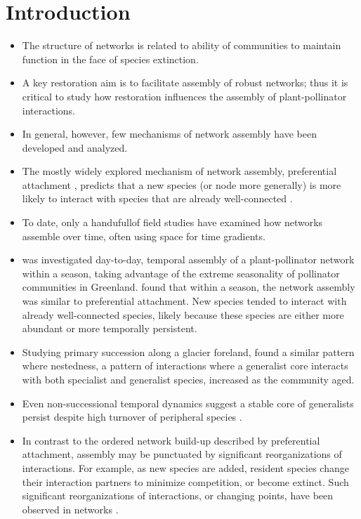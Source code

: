 \documentclass[12pt]{article}
\begin{document}
\section*{Introduction}
\label{sec:introduction}
\begin{itemize}
\item The structure of networks is related to ability of communities
  to maintain function in the face of species extinction.
\item A key restoration aim is to facilitate assembly of robust
  networks; thus it is critical to study how restoration
  influences the assembly of plant-pollinator interactions.
\item In general, however, few mechanisms of network assembly have
  been developed and analyzed.
\item The mostly widely explored mechanism of network assembly,
  preferential attachment \citep{barabasi1999emergence}, predicts that
  a new species (or node more generally) is more likely to interact
  with species that are already well-connected \citep[''the
  rich-get-richer'' principle,][]{barabasi1999emergence}.
\item To date, only a handufullof field studies have examined how networks
  assemble over time, often using space for time gradients.
\item \cite{Olesen2008} was investigated day-to-day, temporal assembly
  of a plant-pollinator network within a season, taking advantage of
  the extreme seasonality of pollinator communities in Greenland.
  \cite{Olesen2008} found that within a season, the network assembly
  was similar to preferential attachment. New species tended to
  interact with already well-connected species, likely because these
  species are either more abundant or more temporally persistent.
\item Studying primary succession along a glacier foreland,
  \cite{albrecht2010plant} found a similar pattern where nestedness, a
  pattern of interactions where a generalist core interacts with both
  specialist and generalist species, increased as the community
  aged. %
\item Even non-successional temporal dynamics suggest a stable core of
  generalists persist despite high turnover of peripheral species
  \citep{fang2012relative, diaz2010changes, alarcon2008year}.
\item In contrast to the ordered network build-up described by
  preferential attachment, assembly may be punctuated by significant
  reorganizations of interactions. For example, as new species are
  added, resident species change their interaction partners to
  minimize competition, or become extinct. Such significant
  reorganizations of interactions, or changing points, have been
  observed in networks \citep{peel2014detecting}.
\end{itemize}
\end{document}
